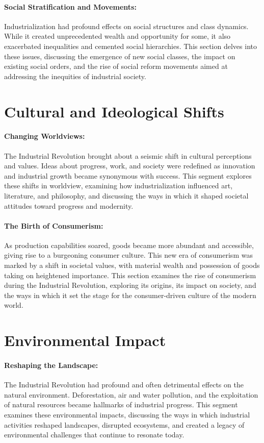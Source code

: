 \documentclass[a4paper,12pt]{book}
\begin{document}
\paragraph{Social Stratification and Movements:}
Industrialization had profound effects on social structures and class dynamics. While it created unprecedented wealth and opportunity for some, it also exacerbated inequalities and cemented social hierarchies. This section delves into these issues, discussing the emergence of new social classes, the impact on existing social orders, and the rise of social reform movements aimed at addressing the inequities of industrial society.

\section*{Cultural and Ideological Shifts}

\paragraph{Changing Worldviews:}
The Industrial Revolution brought about a seismic shift in cultural perceptions and values. Ideas about progress, work, and society were redefined as innovation and industrial growth became synonymous with success. This segment explores these shifts in worldview, examining how industrialization influenced art, literature, and philosophy, and discussing the ways in which it shaped societal attitudes toward progress and modernity.

\paragraph{The Birth of Consumerism:}
As production capabilities soared, goods became more abundant and accessible, giving rise to a burgeoning consumer culture. This new era of consumerism was marked by a shift in societal values, with material wealth and possession of goods taking on heightened importance. This section examines the rise of consumerism during the Industrial Revolution, exploring its origins, its impact on society, and the ways in which it set the stage for the consumer-driven culture of the modern world.

\section*{Environmental Impact}

\paragraph{Reshaping the Landscape:}
The Industrial Revolution had profound and often detrimental effects on the natural environment. Deforestation, air and water pollution, and the exploitation of natural resources became hallmarks of industrial progress. This segment examines these environmental impacts, discussing the ways in which industrial activities reshaped landscapes, disrupted ecosystems, and created a legacy of environmental challenges that continue to resonate today.
\end{document}
